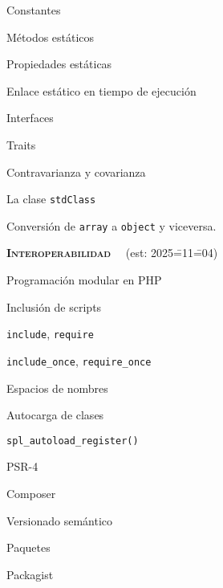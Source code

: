 \begin{longenum}
\begin{longenum}
        \begin{longenum}
            \item Constantes
            \item Métodos estáticos
            \item Propiedades estáticas
            \item Enlace estático en tiempo de ejecución
        \end{longenum}
        \item Interfaces
        \item Traits
        \item Contravarianza y covarianza
        \item La clase \texttt{stdClass}
        \begin{longenum}
            \item Conversión de \texttt{array} a \texttt{object} y viceversa.
        \end{longenum}
    \end{longenum}
    \item \textbf{\textsc{Interoperabilidad}} \ \ (est: 2025\==11\==04)
    \begin{longenum}
        \item Programación modular en PHP
        \begin{longenum}
            \item Inclusión de scripts
            \begin{longenum}
                \item \texttt{include}, \texttt{require}
                \item \texttt{include\_once}, \texttt{require\_once}
            \end{longenum}
            \item Espacios de nombres
            \item Autocarga de clases
            \begin{longenum}
                \item \texttt{spl\_autoload\_register()}
                \item PSR-4
            \end{longenum}
        \end{longenum}
        \item Composer
        \begin{longenum}
            \item Versionado semántico
            \item Paquetes
            \item Packagist

\end{longenum}
\end{longenum}
\end{longenum}

